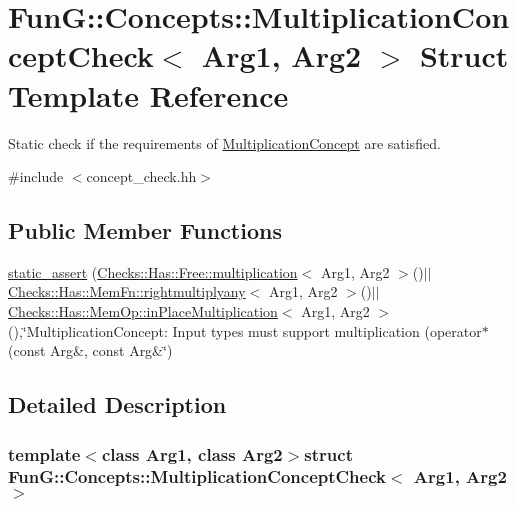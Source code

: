 \hypertarget{structFunG_1_1Concepts_1_1MultiplicationConceptCheck}{\section{\-Fun\-G\-:\-:\-Concepts\-:\-:\-Multiplication\-Concept\-Check$<$ \-Arg1, \-Arg2 $>$ \-Struct \-Template \-Reference}
\label{structFunG_1_1Concepts_1_1MultiplicationConceptCheck}
}


\-Static check if the requirements of \hyperlink{structFunG_1_1Concepts_1_1MultiplicationConcept}{\-Multiplication\-Concept} are satisfied.  




{\ttfamily \#include $<$concept\-\_\-check.\-hh$>$}

\subsection*{\-Public \-Member \-Functions}
\begin{DoxyCompactItemize}
\item 
\hyperlink{structFunG_1_1Concepts_1_1MultiplicationConceptCheck_a642c265f03a1831abfba581e9f393f4a}{static\-\_\-assert} (\hyperlink{namespaceFunG_1_1Checks_1_1Has_1_1Free_a2454bd1f5873cc86ec31d09d822a67b1}{\-Checks\-::\-Has\-::\-Free\-::multiplication}$<$ \-Arg1, \-Arg2 $>$()$|$$|$\hyperlink{namespaceFunG_1_1Checks_1_1Has_1_1MemFn_adeb3d401c6464514644930596c3a4ccc}{\-Checks\-::\-Has\-::\-Mem\-Fn\-::rightmultiplyany}$<$ \-Arg1, \-Arg2 $>$()$|$$|$\hyperlink{namespaceFunG_1_1Checks_1_1Has_1_1MemOp_ae8e502928ebc6342cab98ebbb62b8802}{\-Checks\-::\-Has\-::\-Mem\-Op\-::in\-Place\-Multiplication}$<$ \-Arg1, \-Arg2 $>$(),\char`\"{}\-Multiplication\-Concept\-: \-Input types must support multiplication (operator$\ast$(const \-Arg\&, const \-Arg\&\char`\"{})
\end{DoxyCompactItemize}


\subsection{\-Detailed \-Description}
\subsubsection*{template$<$class \-Arg1, class \-Arg2$>$struct Fun\-G\-::\-Concepts\-::\-Multiplication\-Concept\-Check$<$ Arg1, Arg2 $>$}

